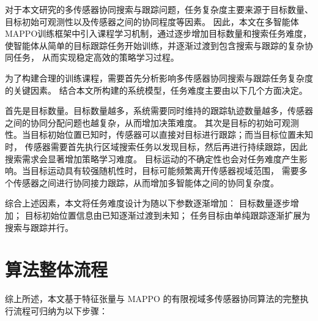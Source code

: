 对于本文研究的多传感器协同搜索与跟踪问题，任务复杂度主要来源于目标数量、
目标初始可观测性以及传感器之间的协同程度等因素。
因此，本文在多智能体MAPPO训练框架中引入课程学习机制，通过逐步增加目标数量和搜索任务难度，
使智能体从简单的目标跟踪任务开始训练，并逐渐过渡到包含搜索与跟踪的复杂协同任务，
从而实现稳定高效的策略学习过程。

为了构建合理的训练课程，需要首先分析影响多传感器协同搜索与跟踪任务复杂度的关键因素。
结合本文所构建的系统模型，任务难度主要由以下几个方面决定。

首先是目标数量。目标数量越多，系统需要同时维持的跟踪轨迹数量越多，传感器之间的协同分配问题也越复杂，从而增加决策难度。
其次是目标的初始可观测性。当目标初始位置已知时，传感器可以直接对目标进行跟踪；而当目标位置未知时，
传感器需要首先执行区域搜索任务以发现目标，然后再进行持续跟踪，因此搜索需求会显著增加策略学习难度。
目标运动的不确定性也会对任务难度产生影响。当目标运动具有较强随机性时，目标可能频繁离开传感器视域范围，
需要多个传感器之间进行协同接力跟踪，从而增加多智能体之间的协同复杂度。

综合上述因素，本文将任务难度设计为随以下参数逐渐增加：
目标数量逐步增加；
目标初始位置信息由已知逐渐过渡到未知；
任务目标由单纯跟踪逐渐扩展为搜索与跟踪并行。



\section{算法整体流程}
综上所述，本文基于特征张量与 MAPPO 的有限视域多传感器协同算法的完整执行流程可归纳为以下步骤：

